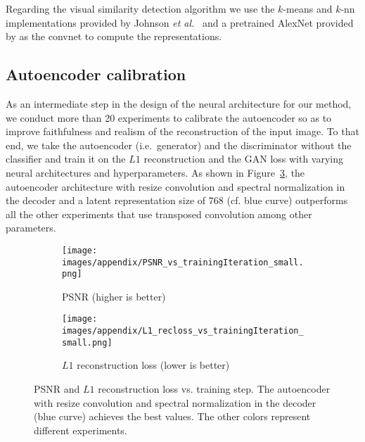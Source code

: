 \documentclass[a4paper,12pt]{report}
\begin{document}
Regarding the visual similarity detection algorithm we use the $k$-means and $k$-nn implementations provided by Johnson \textit{et al.}~\cite{FaissKnn} and a pretrained AlexNet provided by \cite{DeepCluster} as the convnet to compute the representations.


\subsection{Autoencoder calibration}\label{sec:ae_calibration}
As an intermediate step in the design of the neural architecture for our method, we conduct more than 20 experiments to calibrate the autoencoder so as to improve faithfulness and realism of the reconstruction of the input image. To that end, we take the autoencoder (i.e.\ generator) and the discriminator without the classifier and train it on the $L1$ reconstruction and the GAN loss with varying neural architectures and hyperparameters. As shown in Figure~\ref{fig:ae_calib_graphs}, the autoencoder architecture with resize convolution and spectral normalization in the decoder and a latent representation size of 768 (cf. blue curve) outperforms all the other experiments that use transposed convolution among other parameters.
\begin{figure}[h]
\centering
\begin{subfigure}{0.49\textwidth}
\texttt{[image: images/appendix/PSNR\_vs\_trainingIteration\_small.png]} 
\caption{PSNR (higher is better)}
\label{fig:ae_calib_psnr}
\end{subfigure}
\begin{subfigure}{0.49\textwidth}
\texttt{[image: images/appendix/L1\_recloss\_vs\_trainingIteration\_small.png]}
\caption{$L1$ reconstruction loss (lower is better)}
\label{fig:ae_calib_L1recloss}
\end{subfigure}
\caption[PSNR and $L1$ reconstruction loss vs. training step.]{PSNR and $L1$ reconstruction loss vs. training step. The autoencoder with resize convolution and spectral normalization in the decoder (blue curve) achieves the best values. The other colors represent different experiments.}
\label{fig:ae_calib_graphs}
\end{figure}
\end{document}

